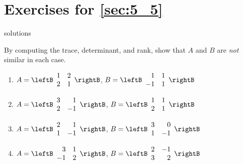 
\section*{Exercises for \ref{sec:5_5}}

\begin{Filesave}{solutions}
\end{Filesave}

\begin{multicols}{2}
\begin{ex}
By computing the trace, determinant, and rank, show that $A$ and $B$ are \textit{not} similar in each case.

\begin{enumerate}[label={\alph*.}]
\item $A = \leftB \begin{array}{rr}
	1 & 2 \\
	2 & 1
\end{array} \rightB$, $B =
\leftB \begin{array}{rr}
	1 & 1\\
	-1 & 1
\end{array} \rightB$

\item $A = 
\leftB \begin{array}{rr}
3 & 1 \\
2 & -1
\end{array} \rightB$, $B =
\leftB \begin{array}{rr}
1 & 1 \\
2 & 1
\end{array} \rightB$

\item $A =
\leftB \begin{array}{rr}
2 & 1 \\
1 & -1 
\end{array} \rightB$, $B =
\leftB \begin{array}{rr}
3 & 0 \\
1 & -1
\end{array} \rightB$

\item $A = 
\leftB \begin{array}{rr}
3 & 1 \\
-1 & 2 
\end{array} \rightB$, $B =
\leftB \begin{array}{rr}
2 & -1 \\
3 & 2
\end{array} \rightB$


\end{enumerate}
\end{ex}
\end{multicols}
